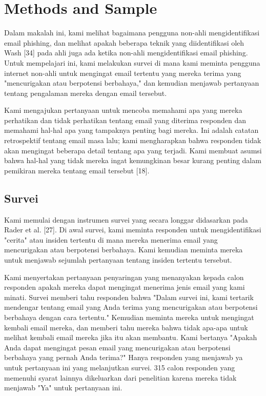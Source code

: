 \documentclass[lettersize,journal]{IEEEtran}
\begin{document}
\section{Methods and Sample}

Dalam makalah ini, kami melihat bagaimana pengguna non-ahli mengidentifikasi email phishing, dan melihat apakah beberapa teknik yang diidentifikasi oleh Wash [34] pada ahli juga ada ketika non-ahli mengidentifikasi email phishing. Untuk mempelajari ini, kami melakukan survei di mana kami meminta pengguna internet non-ahli untuk mengingat email tertentu yang mereka terima yang "mencurigakan atau berpotensi berbahaya," dan kemudian menjawab pertanyaan tentang pengalaman mereka dengan email tersebut.

Kami mengajukan pertanyaan untuk mencoba memahami apa yang mereka perhatikan dan tidak perhatikan tentang email yang diterima responden dan memahami hal-hal apa yang tampaknya penting bagi mereka. Ini adalah catatan retrospektif tentang email masa lalu; kami mengharapkan bahwa responden tidak akan mengingat beberapa detail tentang apa yang terjadi. Kami membuat asumsi bahwa hal-hal yang tidak mereka ingat kemungkinan besar kurang penting dalam pemikiran mereka tentang email tersebut [18].

\subsection{Survei}
Kami memulai dengan instrumen survei yang secara longgar didasarkan pada Rader et al. [27]. Di awal survei, kami meminta responden untuk mengidentifikasi "cerita" atau insiden tertentu di mana mereka menerima email yang mencurigakan atau berpotensi berbahaya. Kami kemudian meminta mereka untuk menjawab sejumlah pertanyaan tentang insiden tertentu tersebut.

Kami menyertakan pertanyaan penyaringan yang menanyakan kepada calon responden apakah mereka dapat mengingat menerima jenis email yang kami minati. Survei memberi tahu responden bahwa "Dalam survei ini, kami tertarik mendengar tentang email yang Anda terima yang mencurigakan atau berpotensi berbahaya dengan cara tertentu." Kemudian meminta mereka untuk mengingat kembali email mereka, dan memberi tahu mereka bahwa tidak apa-apa untuk melihat kembali email mereka jika itu akan membantu. Kami bertanya "Apakah Anda dapat mengingat pesan email yang mencurigakan atau berpotensi berbahaya yang pernah Anda terima?" Hanya responden yang menjawab ya untuk pertanyaan ini yang melanjutkan survei. 315 calon responden yang memenuhi syarat lainnya dikeluarkan dari penelitian karena mereka tidak menjawab "Ya" untuk pertanyaan ini.
\end{document}
